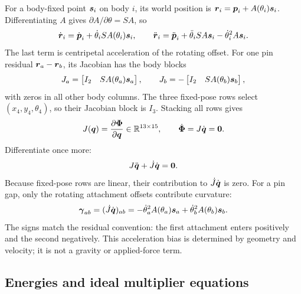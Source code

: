\documentclass[../main.tex]{subfiles}
\begin{document}
	For a body-fixed point $\boldsymbol{s}_i$ on body $i$, its world position is $\boldsymbol{r}_i=\boldsymbol{p}_i+A(\theta_i)\boldsymbol{s}_i$. Differentiating $A$ gives $\partial A/\partial\theta=SA$, so
	\begin{equation}
	\dot{\boldsymbol{r}}_i=\dot{\boldsymbol{p}}_i+\dot\theta_iSA(\theta_i)\boldsymbol{s}_i,
	\qquad
	\ddot{\boldsymbol{r}}_i=\ddot{\boldsymbol{p}}_i+\ddot\theta_iSA\boldsymbol{s}_i-\dot\theta_i^2A\boldsymbol{s}_i.
	\label{eq:five-link-point-kinematics-ch4}
	\end{equation}
	The last term is centripetal acceleration of the rotating offset. For one pin residual $\boldsymbol{r}_a-\boldsymbol{r}_b$, its Jacobian has the body blocks
	\begin{equation}
	J_a=\begin{bmatrix}I_2&SA(\theta_a)\boldsymbol{s}_a\end{bmatrix},
	\qquad
	J_b=-\begin{bmatrix}I_2&SA(\theta_b)\boldsymbol{s}_b\end{bmatrix},
	\label{eq:five-link-pin-jacobian-blocks-ch4}
	\end{equation}
	with zeros in all other body columns. The three fixed-pose rows select $(x_4,y_4,\theta_4)$, so their Jacobian block is $I_3$. Stacking all rows gives
	\begin{equation}
	J(\boldsymbol{q})=\frac{\partial\boldsymbol{\Phi}}{\partial\boldsymbol{q}}\in\mathbb R^{13\times15},
	\qquad
	\dot{\boldsymbol{\Phi}}=J\dot{\boldsymbol{q}}=\boldsymbol{0}.
	\label{eq:five-link-velocity-constraint-ch4}
	\end{equation}
	Differentiate once more:
	\begin{equation}
	J\ddot{\boldsymbol{q}}+\dot J\dot{\boldsymbol{q}}=\boldsymbol{0}.
	\label{eq:five-link-acceleration-constraint-ch4}
	\end{equation}
	Because fixed-pose rows are linear, their contribution to $\dot J\dot{\boldsymbol{q}}$ is zero. For a pin gap, only the rotating attachment offsets contribute curvature:
	\begin{equation}
	\boldsymbol{\gamma}_{ab}=(\dot J\dot{\boldsymbol{q}})_{ab}
	=-\dot\theta_a^2A(\theta_a)\boldsymbol{s}_a
	+\dot\theta_b^2A(\theta_b)\boldsymbol{s}_b.
	\label{eq:five-link-jdot-qdot-pin-ch4}
	\end{equation}
	The signs match the residual convention: the first attachment enters positively and the second negatively. This acceleration bias is determined by geometry and velocity; it is not a gravity or applied-force term.

	\subsection{Energies and ideal multiplier equations}
\end{document}
